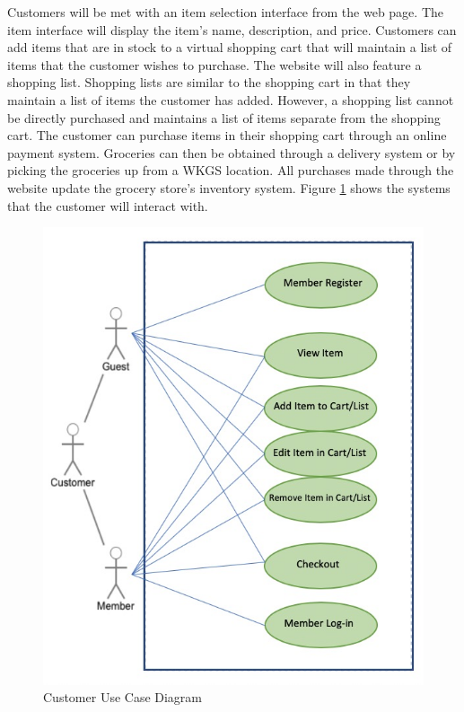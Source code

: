 \documentclass{scrreprt}
\theoremstyle{funreq}
\begin{document}
Customers will be met with an item selection interface from the web page.  The item interface will display the item's name, description, and price.  Customers can add items that are in stock to a virtual shopping cart that will maintain a list of items that the customer wishes to purchase.  The website will also feature a shopping list.  Shopping lists are similar to the shopping cart in that they maintain a list of items the customer has added.  However, a shopping list cannot be directly purchased and maintains a list of items separate from the shopping cart.  The customer can purchase items in their shopping cart through an online payment system.  Groceries can then be obtained through a delivery system or by picking the groceries up from a WKGS location.  All purchases made through the website update the grocery store's inventory system.  Figure \ref{customer_diag} shows the systems that the customer will interact with.

\begin{figure}[H]
	\begin{center}
		\includegraphics[width=3 in]{Customerusecase.jpeg}
		\caption{Customer Use Case Diagram}
		\label{customer_diag}
	\end{center}
\end{figure}
\end{document}
